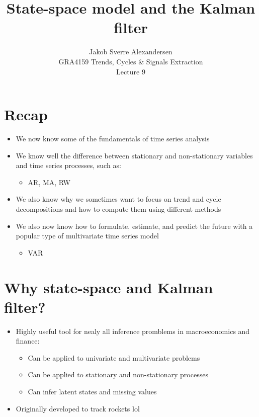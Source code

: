 \documentclass[10pt]{article}
\begin{document}
 
\title{State-space model and the Kalman filter}
\author{Jakob Sverre Alexandersen\\
GRA4159 Trends, Cycles \& Signals Extraction\\
Lecture 9}
\maketitle

\tableofcontents
\newpage

\section{Recap}
\begin{itemize}
    \item We now know some of the fundamentals of time series analysis 
    \item We know well the difference between stationary and non-stationary variables and time series processes, such as: 
    \begin{itemize}
        \item AR, MA, RW 
    \end{itemize}
    \item We also know why we sometimes want to focus on trend and cycle decompositions and how to compute them using different methods 
    \item We also now know how to formulate, estimate, and predict the future with a popular type of multivariate time series model 
    \begin{itemize}
        \item VAR 
    \end{itemize}
\end{itemize}
\section{Why state-space and Kalman filter?}
\begin{itemize}
    \item Highly useful tool for nealy all inference promblems in macroeconomics and finance: 
    \begin{itemize}
        \item Can be applied to univariate and multivariate problems 
        \item Can be applied to stationary and non-stationary processes 
        \item Can infer latent states and missing values 
    \end{itemize}
    \item Originally developed to track rockets lol
\end{itemize}
\end{document}
